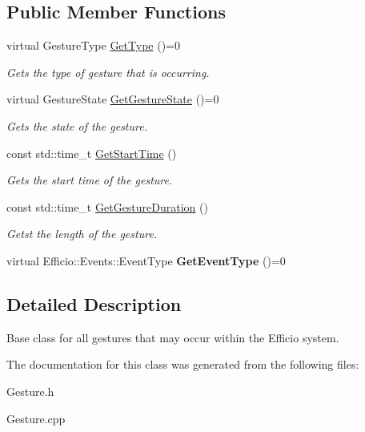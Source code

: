\subsection*{Public Member Functions}
\begin{DoxyCompactItemize}
\item 
\hypertarget{class_efficio_1_1_input_recognition_1_1_gesture_a751d03fe2bc9d025da065cec22936cd0}{}\label{class_efficio_1_1_input_recognition_1_1_gesture_a751d03fe2bc9d025da065cec22936cd0} 
virtual Gesture\+Type \hyperlink{class_efficio_1_1_input_recognition_1_1_gesture_a751d03fe2bc9d025da065cec22936cd0}{Get\+Type} ()=0
\begin{DoxyCompactList}\small\item\em Gets the type of gesture that is occurring. \end{DoxyCompactList}\item 
\hypertarget{class_efficio_1_1_input_recognition_1_1_gesture_a0c607385ed5f969075f2e7a1eb11a85a}{}\label{class_efficio_1_1_input_recognition_1_1_gesture_a0c607385ed5f969075f2e7a1eb11a85a} 
virtual Gesture\+State \hyperlink{class_efficio_1_1_input_recognition_1_1_gesture_a0c607385ed5f969075f2e7a1eb11a85a}{Get\+Gesture\+State} ()=0
\begin{DoxyCompactList}\small\item\em Gets the state of the gesture. \end{DoxyCompactList}\item 
\hypertarget{class_efficio_1_1_input_recognition_1_1_gesture_a22eb9d8533395b04d9f73b57afad09d6}{}\label{class_efficio_1_1_input_recognition_1_1_gesture_a22eb9d8533395b04d9f73b57afad09d6} 
const std\+::time\+\_\+t \hyperlink{class_efficio_1_1_input_recognition_1_1_gesture_a22eb9d8533395b04d9f73b57afad09d6}{Get\+Start\+Time} ()
\begin{DoxyCompactList}\small\item\em Gets the start time of the gesture. \end{DoxyCompactList}\item 
\hypertarget{class_efficio_1_1_input_recognition_1_1_gesture_a018fa00ce8db008e93fb988f649de9a6}{}\label{class_efficio_1_1_input_recognition_1_1_gesture_a018fa00ce8db008e93fb988f649de9a6} 
const std\+::time\+\_\+t \hyperlink{class_efficio_1_1_input_recognition_1_1_gesture_a018fa00ce8db008e93fb988f649de9a6}{Get\+Gesture\+Duration} ()
\begin{DoxyCompactList}\small\item\em Getst the length of the gesture. \end{DoxyCompactList}\item 
\hypertarget{class_efficio_1_1_input_recognition_1_1_gesture_a2867983230c4bc6382e7b8e7e61215b6}{}\label{class_efficio_1_1_input_recognition_1_1_gesture_a2867983230c4bc6382e7b8e7e61215b6} 
virtual Efficio\+::\+Events\+::\+Event\+Type {\bfseries Get\+Event\+Type} ()=0
\end{DoxyCompactItemize}


\subsection{Detailed Description}
Base class for all gestures that may occur within the Efficio system. 

The documentation for this class was generated from the following files\+:\begin{DoxyCompactItemize}
\item 
Gesture.\+h\item 
Gesture.\+cpp\end{DoxyCompactItemize}
